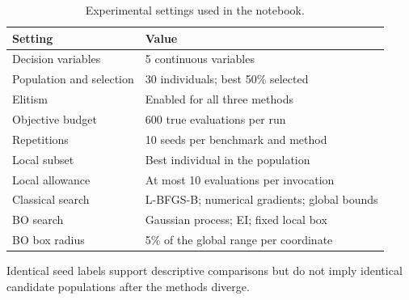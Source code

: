 \begin{table}[H]
\caption{Experimental settings used in the notebook.}
\label{tab:settings} 
\centering
\begin{tabular}{ll}
\toprule
Setting & Value \\
\midrule
Decision variables & 5 continuous variables \\
Population and selection & 30 individuals; best 50\% selected \\
Elitism & Enabled for all three methods \\
Objective budget & 600 true evaluations per run \\
Repetitions & 10 seeds per benchmark and method \\
Local subset & Best individual in the population \\
Local allowance & At most 10 evaluations per invocation \\
Classical search & L-BFGS-B; numerical gradients; global bounds \\
BO search & Gaussian process; EI; fixed local box \\
BO box radius & 5\% of the global range per coordinate \\
\bottomrule
\end{tabular}
\end{table}

Identical seed labels support descriptive comparisons but do not imply identical candidate populations after the methods diverge.



